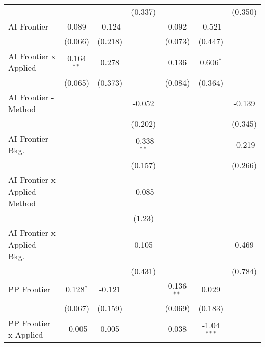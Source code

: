 \begin{tabular}{lcccccc}
                                  &                &               & (0.337)       &                &               & (0.350)\\   
   AI Frontier                    & 0.089          & -0.124        &               & 0.092          & -0.521        &   \\   
                                  & (0.066)        & (0.218)       &               & (0.073)        & (0.447)       &   \\   
   AI Frontier x Applied          & 0.164$^{**}$   & 0.278         &               & 0.136          & 0.606$^{*}$   &   \\   
                                  & (0.065)        & (0.373)       &               & (0.084)        & (0.364)       &   \\   
   AI Frontier - Method           &                &               & -0.052        &                &               & -0.139\\   
                                  &                &               & (0.202)       &                &               & (0.345)\\   
   AI Frontier - Bkg.             &                &               & -0.338$^{**}$ &                &               & -0.219\\   
                                  &                &               & (0.157)       &                &               & (0.266)\\   
   AI Frontier x Applied - Method &                &               & -0.085        &                &               &   \\   
                                  &                &               & (1.23)        &                &               &   \\   
   AI Frontier x Applied - Bkg.   &                &               & 0.105         &                &               & 0.469\\   
                                  &                &               & (0.431)       &                &               & (0.784)\\   
   PP Frontier                    & 0.128$^{*}$    & -0.121        &               & 0.136$^{**}$   & 0.029         &   \\   
                                  & (0.067)        & (0.159)       &               & (0.069)        & (0.183)       &   \\   
   PP Frontier x Applied          & -0.005         & 0.005         &               & 0.038          & -1.04$^{***}$ &   \\   

\end{tabular}

